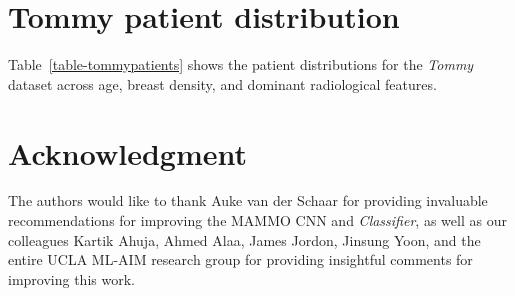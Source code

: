 \documentclass[journal]{IEEEtran}
\begin{document}
\section{\label{Appendix:Tommy} Tommy patient distribution}

Table~\ref{table-tommypatients} shows the patient distributions for the \textit{Tommy} dataset across age, breast density, and dominant radiological features. 


\section*{Acknowledgment}
The authors would like to thank Auke van der Schaar for providing invaluable recommendations for improving the MAMMO CNN and \textit{Classifier}, as well as our colleagues Kartik Ahuja, Ahmed Alaa, James Jordon, Jinsung Yoon, and the entire UCLA ML-AIM research group for providing insightful comments for improving this work.   




\ifCLASSOPTIONcaptionsoff
  \newpage
\fi


%
%
%
\end{document}
